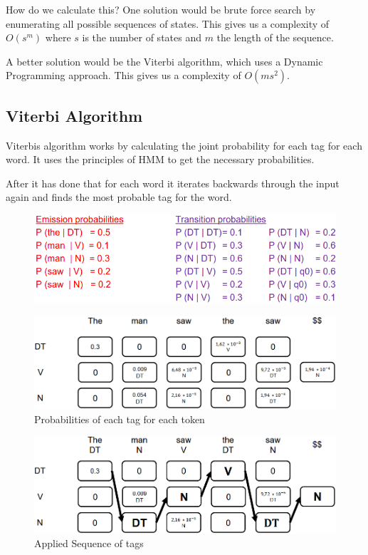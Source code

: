 \documentclass[
../../NLP4W_Summary.tex,
]
{subfiles}
\begin{document}
How do we calculate this? One solution would be brute force search by enumerating all possible sequences of states. This gives us a complexity of $O(s^m)$ where $s$ is the number of states and $m$ the length of the sequence. 

A better solution would be the Viterbi algorithm, which uses a Dynamic Programming approach. This gives us a complexity of $O(ms^2)$.

\subsection{Viterbi Algorithm}
Viterbis algorithm works by calculating the joint probability for each tag for each word. It uses the principles of HMM to get the necessary probabilities. 

After it has done that for each word it iterates backwards through the input again and finds the most probable tag for the word. 

\begin{figure}[htp]
    \centering
    \includegraphics[scale=0.5]{Pics/ViterbiExampleProbabilities.png}
\end{figure}

\begin{figure}[htp]
    \centering
    \includegraphics[scale=0.5]{Pics/ViterbiExampleTokenProbabilities.png}
    \caption{Probabilities of each tag for each token}
\end{figure}

\begin{figure}
    [htp]
    \centering
    \includegraphics[scale=0.5]{Pics/ViterbiExampleOutput.png}
    \caption{Applied Sequence of tags}
\end{figure}
\end{document}
